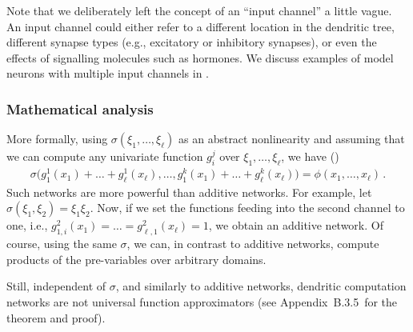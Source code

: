Note that we deliberately left the concept of an \enquote{input channel} a little vague.
An input channel could either refer to a different location in the dendritic tree, different synapse types (e.g., excitatory or inhibitory synapses), or even the effects of signalling molecules such as hormones.
We discuss examples of model neurons with multiple input channels in .

\subsubsection{Mathematical analysis}
More formally, using $\sigma(\xi_1, \ldots, \xi_\ell)$ as an abstract nonlinearity and assuming that we can compute any univariate function $g_i^j$ over $\xi_1, \ldots, \xi_\ell$, we have ()
\begin{align}
	\sigma \bigl(
		g_{1}^1(x_1) + \ldots + g_{\ell}^1(x_\ell), \ldots, g_{1}^k(x_1) + \ldots + g_{\ell}^k(x_\ell)
	\bigr) = \phi(x_1, \ldots, x_\ell) \,.
	\label{eqn:dendritic_computation_theory}
\end{align}
Such networks are more powerful than additive networks.
For example, let $\sigma(\xi_1, \xi_2) = \xi_1 \xi_2$.
Now, if we set the functions feeding into the second channel to one, i.e., $g_{1, i}^2(x_1) = \ldots = g_{\ell, 1}^2(x_\ell) = 1$, we obtain an additive network.
Of course, using the same $\sigma$, we can, in contrast to additive networks, compute products of the pre-variables over arbitrary domains.

Still, independent of $\sigma$, and similarly to additive networks, dendritic computation networks are not universal function approximators (see Appendix~B.3.5~for the theorem and proof).


